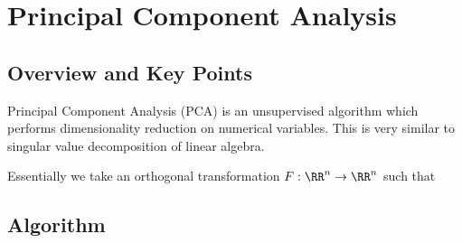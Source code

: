 \section{Principal Component Analysis}

\subsection{Overview and Key Points} Principal Component Analysis (PCA) is an unsupervised algorithm which performs dimensionality reduction on numerical variables. This is very similar to singular value decomposition of linear algebra.

Essentially we take an orthogonal transformation $F: \RR^n \to \RR^n$  such that 

\subsection{Algorithm}

